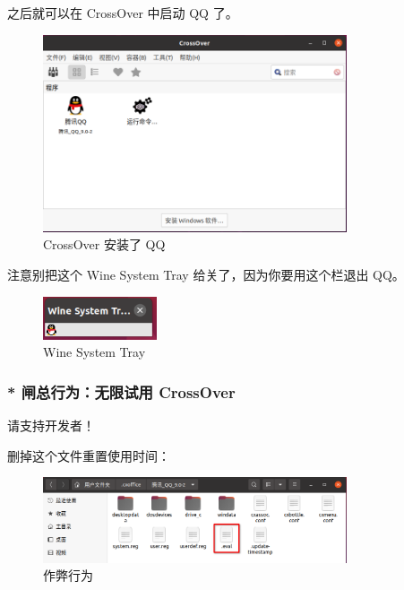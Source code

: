 \documentclass[UTF-8]{ctexart}
\begin{document}
				之后就可以在 CrossOver 中启动 QQ 了。
				
				\begin{figure}[H]
					\centering
					\includegraphics[width=0.8\textwidth]{fig/crossover_qq_installed.png}
					\caption*{CrossOver 安装了 QQ}
				\end{figure}
			
				注意别把这个 Wine System Tray 给关了，因为你要用这个栏退出 QQ。
				
				\begin{figure}[H]
					\centering
					\includegraphics[width=0.3\textwidth]{fig/wine_system_tray.png}
					\caption*{Wine System Tray}
				\end{figure}
			
			\subsubsection{* 闸总行为：无限试用 CrossOver}
			
				{\huge 请支持开发者！}
				
				删掉这个文件重置使用时间：
				
				\begin{figure}[H]
					\centering
					\includegraphics[width=0.8\textwidth]{fig/crossover_cheat.png}
					\caption*{作弊行为}
				\end{figure}
			
\end{document}
